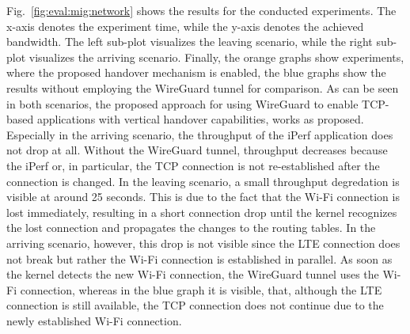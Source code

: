 Fig.~\ref{fig:eval:mig:network} shows the results for the conducted experiments.
The x-axis denotes the experiment time, while the y-axis denotes the achieved bandwidth.
The left sub-plot visualizes the leaving scenario, while the right sub-plot visualizes the arriving scenario.
Finally, the orange graphs show experiments, where the proposed handover mechanism is enabled, the blue graphs show the results without employing the WireGuard tunnel for comparison.
As can be seen in both scenarios, the proposed approach for using WireGuard to enable TCP-based applications with vertical handover capabilities, works  as proposed.
Especially in the arriving scenario, the throughput of the iPerf application does not drop at all.
Without the WireGuard tunnel, throughput decreases because the iPerf or, in particular, the TCP connection is not re-established after the connection is changed.
In the leaving scenario, a small throughput degredation is visible at around 25 seconds.
This is due to the fact that the Wi-Fi connection is lost immediately, resulting in a short connection drop until the kernel recognizes the lost connection and propagates the changes to the routing tables.
In the arriving scenario, however, this drop is not visible since the LTE connection does not break but rather the Wi-Fi connection is established in parallel.
As soon as the kernel detects the new Wi-Fi connection, the WireGuard tunnel uses the Wi-Fi connection, whereas in the blue graph it is visible, that, although the LTE connection is still available, the TCP connection does not continue due to the newly established Wi-Fi connection.

